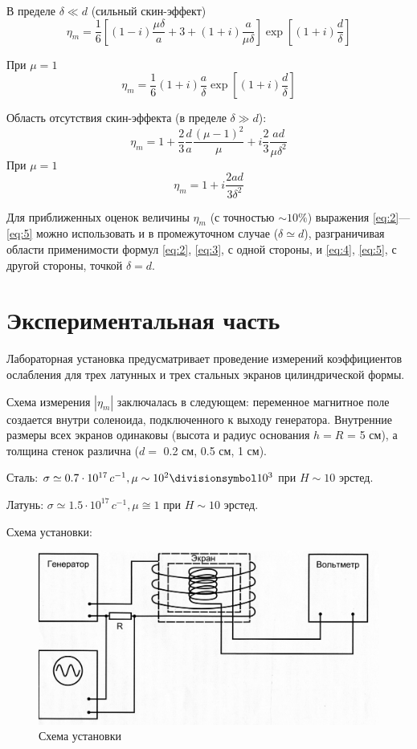 В пределе $\delta \ll d$ (сильный скин-эффект)
	\begin{equation} 
		\eta_{m}=\frac{1}{6}\left[(1-i) \frac{\mu \delta}{a}+3+(1+i) \frac{a}{\mu \delta}\right] \exp \left[(1+i) \frac{d}{\delta}\right]
	\label{eq:2}
	\end{equation}

При $\mu=1$
\begin{equation} 
	\eta_{m}=\frac{1}{6}(1+i) \frac{a}{\delta} \exp \left[(1+i) \frac{d}{\delta}\right]
	\label{eq:3}
\end{equation}

Область отсутствия скин-эффекта (в пределе $\delta \gg d$):
\begin{equation}
	\eta_{m}=1+\frac{2}{3}\frac{d}{a}\frac{(\mu-1)^2}{\mu}+i\frac{2}{3}\frac{ad}{\mu \delta^2}
	\label{eq:4}
\end{equation}
При $\mu=1$
\begin{equation} 
	\eta_{m}=1+i \frac{2 a d}{3 \delta^{2}}
	\label{eq:5}
\end{equation}

Для приближенных оценок величины $\eta_{m}$ (с точностью $\sim10\%$) выражения \eqref{eq:2}—\eqref{eq:5} можно использовать и в промежуточном случае ($\delta \simeq d$), разграничивая области применимости формул \eqref{eq:2}, \eqref{eq:3}, с одной стороны, и \eqref{eq:4}, \eqref{eq:5}, с другой стороны, точкой $\delta = d$.

\newpage
\section{Экспериментальная часть}
Лабораторная установка предусматривает проведение измерений коэффициентов ослабления для трех латунных и трех стальных экранов цилиндрической формы. 

Схема измерения $|\eta_m|$ заключалась в следующем: переменное магнитное поле создается внутри соленоида, подключенного к выходу генератора. Внутренние размеры всех экранов одинаковы (высота и радиус основания $h=R$ = 5 см), а толщина стенок различна ($d=$ 0.2 см, 0.5 см, 1 см). 

Сталь: $\sigma \simeq 0.7\cdot 10^{17} \,c^{-1}, \mu \sim 10^2 \divisionsymbol 10^3 $ при $H \sim 10$ эрстед.

Латунь: $\sigma \simeq 1.5\cdot 10^{17}\, c^{-1}, \mu \cong 1$ при $H \sim 10$ эрстед.

Схема установки:
\begin{figure}[H]
    \centering
    \includegraphics[width = 0.9\linewidth]{imgs/graphs/img744.jpg}
    \caption{Схема установки}
    \label{fig:1}
\end{figure}

